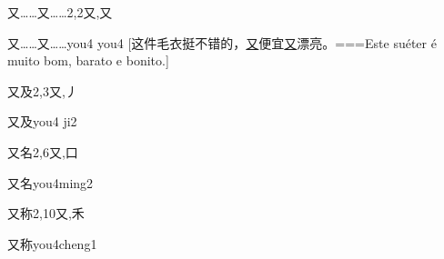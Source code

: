 \begin{Entry}{又……又……}{2,2}{⼜,⼜}
  \begin{Phonetics}{又……又……}{you4 you4}
    [这件毛衣挺不错的，\underline{又}便宜\underline{又}漂亮。===Este suéter é muito bom, barato e bonito.]
  \end{Phonetics}
\end{Entry}

\begin{Entry}{又及}{2,3}{⼜,⼃}
  \begin{Phonetics}{又及}{you4 ji2}
  \end{Phonetics}
\end{Entry}

\begin{Entry}{又名}{2,6}{⼜,⼝}
  \begin{Phonetics}{又名}{you4ming2}
  \end{Phonetics}
\end{Entry}

\begin{Entry}{又称}{2,10}{⼜,⽲}
  \begin{Phonetics}{又称}{you4cheng1}
  \end{Phonetics}
\end{Entry}


